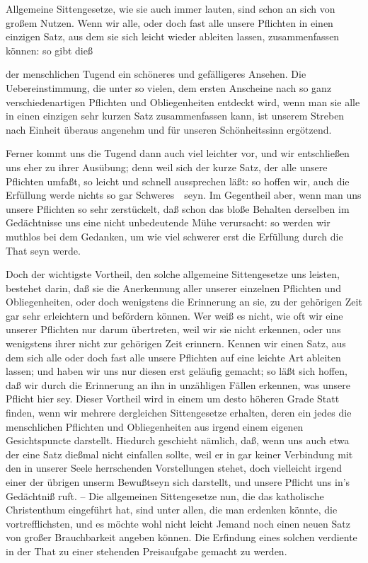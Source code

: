 Allgemeine Sittengesetze, wie sie auch immer lauten, sind schon an sich von großem Nutzen. Wenn wir alle, oder doch fast alle unsere Pflichten in einen einzigen Satz, aus dem sie sich leicht wieder ableiten lassen, zusammenfassen können: so gibt dieß
\begin{aufzb}
\item der menschlichen Tugend ein schöneres und gefälligeres Ansehen. Die Uebereinstimmung, die unter so vielen, dem ersten Anscheine nach so ganz verschiedenartigen Pflichten und Obliegenheiten entdeckt wird, wenn man sie alle in einen einzigen sehr kurzen Satz zusammenfassen kann, ist unserem Streben nach Einheit überaus angenehm und für unseren Schönheitssinn ergötzend.
\item Ferner kommt uns die Tugend dann auch viel leichter vor, und wir entschließen uns eher zu ihrer Ausübung; denn weil sich der kurze Satz, der alle unsere Pflichten umfaßt, so leicht und schnell aussprechen läßt: so hoffen wir, auch die Erfüllung werde nichts so gar Schweres~\ seyn. Im Gegentheil aber, wenn man uns unsere Pflichten so sehr zerstückelt, daß schon das bloße Behalten derselben im Gedächtnisse uns eine nicht unbedeutende Mühe verursacht: so werden wir muthlos bei dem Gedanken, um wie viel schwerer erst die Erfüllung durch die That seyn werde.
\item Doch der wichtigste Vortheil, den solche allgemeine Sittengesetze uns leisten, bestehet darin, daß sie die Anerkennung aller unserer einzelnen Pflichten und Obliegenheiten, oder doch wenigstens die Erinnerung an sie, zu der gehörigen Zeit gar sehr erleichtern und befördern können. Wer weiß es nicht, wie oft wir eine unserer Pflichten nur darum übertreten, weil wir sie nicht erkennen, oder uns wenigstens ihrer nicht zur gehörigen Zeit erinnern. Kennen wir einen Satz, aus dem sich alle oder doch fast alle unsere Pflichten auf eine leichte Art ableiten lassen; und haben wir uns nur diesen erst geläufig gemacht; so läßt sich hoffen, daß wir durch die Erinnerung an ihn in unzähligen Fällen erkennen, was unsere Pflicht hier sey. Dieser Vortheil wird in einem um desto höheren Grade Statt finden, wenn wir mehrere dergleichen Sittengesetze erhalten, deren ein jedes die menschlichen Pflichten und Obliegenheiten aus irgend einem eigenen Gesichtspuncte darstellt. Hiedurch geschieht nämlich, daß, wenn uns auch etwa der eine Satz dießmal nicht einfallen sollte, weil er in gar keiner Verbindung mit den in unserer Seele herrschenden Vorstellungen stehet, doch vielleicht irgend einer der übrigen unserm Bewußtseyn sich darstellt, und unsere Pflicht uns in's Gedächtniß ruft. -- Die allgemeinen Sittengesetze nun, die das katholische Christenthum eingeführt hat, sind unter allen, die man erdenken könnte, die vortrefflichsten, und es möchte wohl nicht leicht Jemand noch einen neuen Satz von großer Brauchbarkeit angeben können. Die Erfindung eines solchen verdiente in der That zu einer stehenden Preisaufgabe gemacht zu werden.
\end{aufzb}
